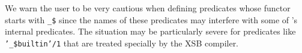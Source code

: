 We warn the user to be very cautious when defining predicates whose functor
starts with {\tt \_\$}  since the names of these predicates may interfere with
some of \ourprolog's internal predicates.  The situation may be particularly
severe for predicates like {\tt '\_\$builtin'/1} that are treated specially
by the XSB compiler.





